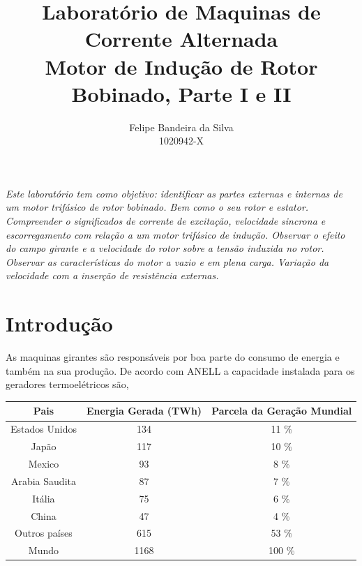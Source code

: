 \documentclass[paper=a4, fontsize=11pt]{article}
\title{Laboratório de Maquinas de Corrente Alternada\\
Motor de Indução de Rotor Bobinado, Parte I e II}
\author{Felipe Bandeira da Silva\\1020942-X}
\begin{document}
\maketitle


\textit{Este laboratório tem como objetivo: identificar 
as partes externas e internas de um motor trifásico de 
rotor bobinado. Bem como o seu rotor e estator. 
Compreender o significados de corrente de excitação, 
velocidade sincrona e escorregamento com relação a um 
motor trifásico de indução. Observar o efeito do 
campo girante e a velocidade do rotor sobre  a tensão
induzida no rotor. Observar as características do motor
a vazio e em plena carga. Variação da velocidade com a 
inserção de resistência externas.}

\newpage

\tableofcontents

\newpage



\newpage
\section{Introdução}
As maquinas girantes são responsáveis por boa parte
do consumo de energia e também na sua produção. De 
acordo com ANELL a capacidade instalada para os 
geradores termoelétricos são, 

\begin{center}
    \begin{tabular}{c|c|c}
        Pais & Energia Gerada (TWh) & Parcela da Geração Mundial \\
        \hline
        Estados Unidos & 134 & 11 $\%$ \\
        Japão & 117 & 10 $\%$ \\
        Mexico & 93 & 8 $\%$ \\
        Arabia Saudita & 87 & 7 $\%$ \\
        Itália & 75 & 6 $\%$ \\
        China & 47 & 4 $\%$ \\
        Outros países & 615 & 53 $\%$ \\
        Mundo & 1168 & 100 $\%$
    \end{tabular}
\end{center}
\end{document}
